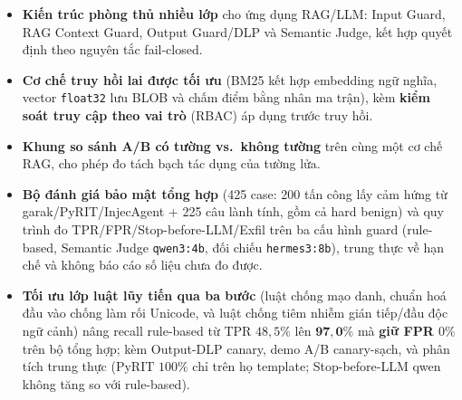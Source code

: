 \begin{itemize}
    \item \textbf{Kiến trúc phòng thủ nhiều lớp} cho ứng dụng RAG/LLM: Input
    Guard, RAG Context Guard, Output Guard/DLP và Semantic Judge, kết hợp
    quyết định theo nguyên tắc fail-closed.
    \item \textbf{Cơ chế truy hồi lai được tối ưu} (BM25 kết hợp embedding ngữ
    nghĩa, vector \texttt{float32} lưu BLOB và chấm điểm bằng nhân ma trận), kèm
    \textbf{kiểm soát truy cập theo vai trò} (RBAC) áp dụng trước truy hồi.
    \item \textbf{Khung so sánh A/B có tường vs.\ không tường} trên cùng một cơ
    chế RAG, cho phép đo tách bạch tác dụng của tường lửa.
    \item \textbf{Bộ đánh giá bảo mật tổng hợp} (425 case: 200 tấn công lấy cảm
    hứng từ garak/PyRIT/InjecAgent + 225 câu lành tính, gồm cả hard benign) và
    quy trình đo TPR/FPR/Stop-before-LLM/Exfil trên ba cấu hình guard
    (rule-based, Semantic Judge \texttt{qwen3:4b}, đối chiếu \texttt{hermes3:8b}),
    trung thực về hạn chế và không báo cáo số liệu chưa đo được.
    \item \textbf{Tối ưu lớp luật lũy tiến qua ba bước} (luật chống mạo danh,
    chuẩn hoá đầu vào chống làm rối Unicode, và luật chống tiêm nhiễm gián
    tiếp/đầu độc ngữ cảnh) nâng recall rule-based từ TPR $48{,}5\%$ lên
    $\mathbf{97{,}0\%}$ mà \textbf{giữ FPR $0\%$} trên bộ tổng hợp; kèm
    Output-DLP canary, demo A/B canary-sạch, và phân tích trung thực (PyRIT
    $100\%$ chỉ trên họ template; Stop-before-LLM qwen không tăng so với
    rule-based).
\end{itemize}
